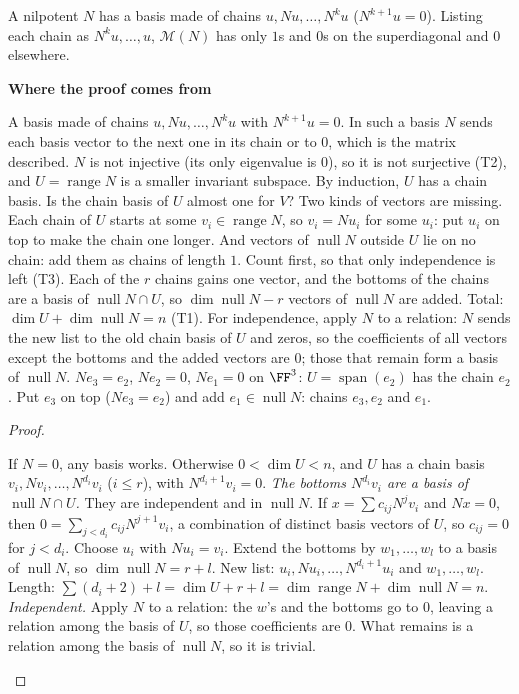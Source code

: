 \documentclass[10pt]{scrartcl}
\DeclareMathOperator{\nul}{null}
\DeclareMathOperator{\range}{range}
\DeclareMathOperator{\spn}{span}
\newcommand{\MM}{\mathcal M}
\newenvironment{motive}{\begin{mdframed}[style=thinkbox]\textbf{\color{OliveGreen!75!black}Where the proof comes from}\begin{description}[leftmargin=0.9em,labelindent=0pt,itemsep=2pt,topsep=2pt,font=\normalfont\bfseries\color{OliveGreen!70!black}]}{\end{description}\end{mdframed}}
\newenvironment{steps}{\begin{enumerate}[label=\arabic*.,leftmargin=1.5em,itemsep=2pt,topsep=2pt]}{\end{enumerate}}
\begin{document}
\begin{theorem*}
  A nilpotent $N$ has a basis made of chains $u,Nu,\dots,N^ku$ ($N^{k+1}u=0$). Listing each chain as $N^ku,\dots,u$, $\MM(N)$ has only $1$s and $0$s on the superdiagonal and $0$ elsewhere.
\end{theorem*}
\begin{motive}
  \ii[Want.] A basis made of chains $u,Nu,\dots,N^ku$ with $N^{k+1}u=0$. In such a basis $N$ sends each basis vector to the next one in its chain or to $0$, which is the matrix described.
  \ii[Know.] $N$ is not injective (its only eigenvalue is $0$), so it is not surjective (T2), and $U=\range N$ is a smaller invariant subspace. By induction, $U$ has a chain basis.
   Is the chain basis of $U$ almost one for $V$? Two kinds of vectors are missing. Each chain of $U$ starts at some $v_i\in\range N$, so $v_i=Nu_i$ for some $u_i$: put $u_i$ on top to make the chain one longer. And vectors of $\nul N$ outside $U$ lie on no chain: add them as chains of length $1$.
   Count first, so that only independence is left (T3). Each of the $r$ chains gains one vector, and the bottoms of the chains are a basis of $\nul N\cap U$, so $\dim\nul N-r$ vectors of $\nul N$ are added. Total: $\dim U+\dim\nul N=n$ (T1). For independence, apply $N$ to a relation: $N$ sends the new list to the old chain basis of $U$ and zeros, so the coefficients of all vectors except the bottoms and the added vectors are $0$; those that remain form a basis of $\nul N$.
  \ii[Example.] $Ne_3=e_2$, $Ne_2=0$, $Ne_1=0$ on $\FF^3$: $U=\spn(e_2)$ has the chain $e_2$. Put $e_3$ on top ($Ne_3=e_2$) and add $e_1\in\nul N$: chains $e_3,e_2$ and $e_1$.
\end{motive}
\begin{proof}
  \begin{steps}
    \ii If $N=0$, any basis works. Otherwise $0<\dim U<n$, and $U$ has a chain basis $v_i,Nv_i,\dots,N^{d_i}v_i$ ($i\le r$), with $N^{d_i+1}v_i=0$.
    \ii \emph{The bottoms $N^{d_i}v_i$ are a basis of $\nul N\cap U$.} They are independent and in $\nul N$. If $x=\sum c_{ij}N^jv_i$ and $Nx=0$, then $0=\sum_{j<d_i}c_{ij}N^{j+1}v_i$, a combination of distinct basis vectors of $U$, so $c_{ij}=0$ for $j<d_i$.
    \ii Choose $u_i$ with $Nu_i=v_i$. Extend the bottoms by $w_1,\dots,w_l$ to a basis of $\nul N$, so $\dim\nul N=r+l$.
    \ii New list: $u_i,Nu_i,\dots,N^{d_i+1}u_i$ and $w_1,\dots,w_l$. Length: $\sum(d_i+2)+l=\dim U+r+l=\dim\range N+\dim\nul N=n$.
    \ii \emph{Independent.} Apply $N$ to a relation: the $w$'s and the bottoms go to $0$, leaving a relation among the basis of $U$, so those coefficients are $0$. What remains is a relation among the basis of $\nul N$, so it is trivial.
  \end{steps}
\end{proof}
\end{document}
